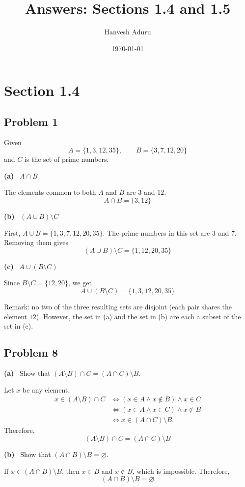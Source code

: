 \documentclass[11pt,a4paper]{article}
\title{Answers: Sections 1.4 and 1.5}
\author{Hanvesh Aduru}
\date{\today}
\newcommand{\sub}[1]{\par\medskip\textbf{(#1)}\ }
\begin{document}
\maketitle

\section*{Section 1.4}

\subsection*{Problem 1}
Given
\[
A=\{1,3,12,35\},\qquad B=\{3,7,12,20\}
\]
and $C$ is the set of prime numbers.

\sub{a} $A\cap B$

The elements common to both $A$ and $B$ are $3$ and $12$.
\[
\boxed{A\cap B=\{3,12\}}
\]

\sub{b} $(A\cup B)\setminus C$

First, $A\cup B=\{1,3,7,12,20,35\}$. The prime numbers in this set are $3$ and $7$. Removing them gives
\[
\boxed{(A\cup B)\setminus C=\{1,12,20,35\}}
\]

\sub{c} $A\cup(B\setminus C)$

Since $B\setminus C=\{12,20\}$, we get
\[
\boxed{A\cup(B\setminus C)=\{1,3,12,20,35\}}
\]

Remark: no two of the three resulting sets are disjoint (each pair shares the element $12$). However, the set in (a) and the set in (b) are each a subset of the set in (c).

\subsection*{Problem 8}

\sub{a} Show that $(A\setminus B)\cap C=(A\cap C)\setminus B$.

Let $x$ be any element.
\begin{align*}
x\in(A\setminus B)\cap C &\iff (x\in A\land x\notin B)\land x\in C\\
&\iff (x\in A\land x\in C)\land x\notin B\\
&\iff x\in(A\cap C)\setminus B.
\end{align*}
Therefore,
\[
\boxed{(A\setminus B)\cap C=(A\cap C)\setminus B}
\]

\sub{b} Show that $(A\cap B)\setminus B=\varnothing$.

If $x\in(A\cap B)\setminus B$, then $x\in B$ and $x\notin B$, which is impossible. Therefore,
\[
\boxed{(A\cap B)\setminus B=\varnothing}
\]
\end{document}
